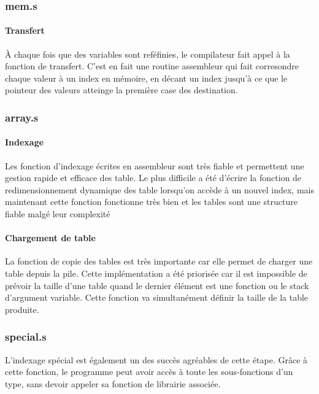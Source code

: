 \documentclass{article}
\begin{document}
\subsubsection{mem.s}
\paragraph{Transfert}
À chaque fois que des variables sont reféfinies, le compilateur fait appel à la fonction de transfert. C'est en fait une routine assembleur qui fait corresondre chaque valeur à un index en mémoire, en décant un index jusqu'à ce que le pointeur des valeurs atteinge la première case des destination.

\subsubsection{array.s}
\paragraph{Indexage}
Les fonction d'indexage écrites en assembleur sont très fiable et permettent une gestion rapide et efficace des table. Le plus difficile a été d'écrire la fonction de redimensionnement dynamique des table lorsqu'on accède à un nouvel index, mais maintenant cette fonction fonctionne très bien et les tables sont une structure fiable malgé leur complexité

\paragraph{Chargement de table}
La fonction de copie des tables est très importante car elle permet de charger une table depuis la pile. Cette implémentation a été priorisée car il est impossible de prévoir la taille d'une table quand le dernier élément est une fonction ou le stack d'argument variable. Cette fonction va simultanément définir la taille de la table produite.

\subsubsection{special.s}
L'indexage spécial est également un des succès agréables de cette étape. Grâce à cette fonction, le programme peut avoir accès à toute les sous-fonctions d'un type, sans devoir appeler sa fonction de librairie associée.
\end{document}
